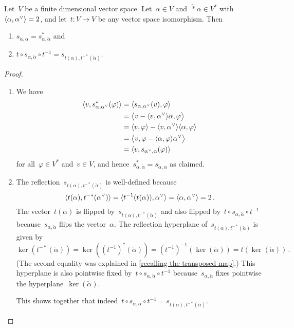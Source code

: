 \begin{lemma}
  \label{properties of reflections}
  Let~$V$ be a finite dimensional vector space.
  Let~$\alpha \in V$ and~$\check*{\alpha} \in V^*$ with~$\pair{\alpha, \check{\alpha}} = 2$, and let~$t \colon V \to V$ be any vector space isomorphism.
  Then
  \begin{enumerate}
    \item
      $s_{\check{\alpha}, \alpha} = s_{\alpha, \check{\alpha}}^*$ and
    \item
      $t \circ s_{\alpha, \check{\alpha}} \circ t^{-1} = s_{t(\alpha), t^{-*}(\check{\alpha})}$.
  \end{enumerate}
\end{lemma}


\begin{proof}
  \leavevmode
  \begin{enumerate}
    \item
      We have
      \begin{align*}
        \pair{v, s_{\alpha, \check{\alpha}}^*(\varphi)}
        &=
        \pair{s_{\alpha, \check{\alpha}}(v), \varphi}
        \\
        &=
        \pair[\big]{v - \pair{v, \check{\alpha}} \alpha, \varphi}
        \\
        &=
        \pair{v, \varphi} - \pair{v, \check{\alpha}} \pair{\alpha, \varphi}
        \\
        &=
        \pair[\big]{v, \varphi - \pair{\alpha, \varphi} \check{\alpha}}
        \\
        &=
        \pair{v, s_{\check{\alpha}, \alpha}(\varphi)}
      \end{align*}
       for all~$\varphi \in V^*$ and~$v \in V$, and hence~$s_{\alpha, \check{\alpha}}^* = s_{\check{\alpha}, \alpha}$ as claimed.
    \item
      The reflection~$s_{t(\alpha), t^{-*}(\check{\alpha})}$ is well-defined because
      \[
        \pair{t(\alpha), t^{-*}(\check{\alpha})}
        =
        \pair{t^{-1}(t(\alpha)), \check{\alpha}}
        =
        \pair{\alpha, \check{\alpha}}
        =
        2 \,.
      \]
      The vector~$t(\alpha)$ is flipped by~$s_{t(\alpha), t^{-*}(\check{\alpha})}$ and also flipped by~$t \circ s_{\alpha, \check{\alpha}} \circ t^{-1}$ because~$s_{\alpha, \check{\alpha}}$ flips the vector~$\alpha$.
      The reflection hyperplane of~$s_{t(\alpha), t^{-*}(\check{\alpha})}$ is given by
      \[
        \ker(t^{-*}(\check{\alpha}))
        =
        \ker((t^{-1})^*(\check{\alpha}))
        =
        (t^{-1})^{-1}(\ker(\check{\alpha}))
        =
        t(\ker(\check{\alpha})) \,.
      \]
      (The second equality was explained in \cref{recalling the transposed map}.)
      This hyperplane is also pointwise fixed by~$t \circ s_{\alpha, \check{\alpha}} \circ t^{-1}$ because~$s_{\alpha, \check{\alpha}}$ fixes pointwise the hyperplane~$\ker(\check{\alpha})$.
      
      This shows together that indeed~$t \circ s_{\alpha, \check{\alpha}} \circ t^{-1} = s_{t(\alpha), t^{-*}(\check{\alpha})}$.
    \qedhere
  \end{enumerate}
\end{proof}





